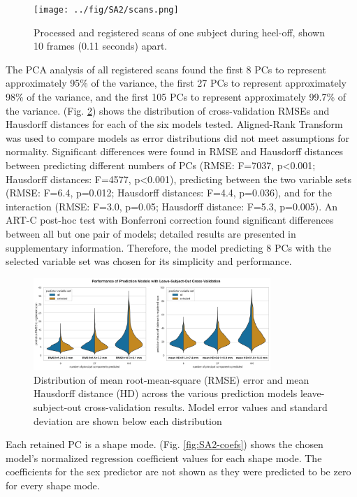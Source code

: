 \documentclass[defaultstyle,11pt]{thesis}
\begin{document}
\begin{figure}
\hypertarget{fig:scans}{%
\centering
\texttt{[image: ../fig/SA2/scans.png]}
\caption{Processed and registered scans of one subject during heel-off, shown 10 frames (0.11 seconds) apart.}\label{fig:scans}
}
\end{figure}

The PCA analysis of all registered scans found the first 8 PCs to represent approximately 95\% of the variance, the first 27 PCs to represent approximately 98\% of the variance, and the first 105 PCs to represent approximately 99.7\% of the variance.
(Fig. \ref{fig:modelperf}) shows the distribution of cross-validation RMSEs and Hausdorff distances for each of the six models tested.
Aligned-Rank Transform \citep{Wobbrock2011} was used to compare models as error distributions did not meet assumptions for normality.
Significant differences were found in RMSE and Hausdorff distances between predicting different numbers of PCs (RMSE: F=7037, p\textless0.001; Hausdorff distances: F=4577, p\textless0.001), predicting between the two variable sets (RMSE: F=6.4, p=0.012; Hausdorff distances: F=4.4, p=0.036), and for the interaction (RMSE: F=3.0, p=0.05; Hausdorff distance: F=5.3, p=0.005).
An ART-C post-hoc test \citep{Elkin2021} with Bonferroni correction found significant differences between all but one pair of models; detailed results are presented in supplementary information.
Therefore, the model predicting 8 PCs with the selected variable set was chosen for its simplicity and performance.

\begin{figure}
\hypertarget{fig:modelperf}{%
\centering
\includegraphics[width=0.8\textwidth,height=\textheight]{../fig/SA2/modelPerformance.png}
\caption{Distribution of mean root-mean-square (RMSE) error and mean Hausdorff distance (HD) across the various prediction models leave-subject-out cross-validation results. Model error values and standard deviation are shown below each distribution}\label{fig:modelperf}
}
\end{figure}

Each retained PC is a shape mode.
(Fig. \ref{fig:SA2-coefs}) shows the chosen model's normalized regression coefficient values for each shape mode.
The coefficients for the sex predictor are not shown as they were predicted to be zero for every shape mode.
\end{document}

